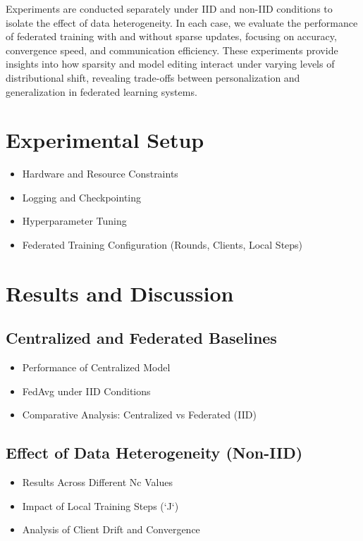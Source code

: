 \documentclass[10pt,twocolumn,letterpaper]{article}
\begin{document}
Experiments are conducted separately under IID and non-IID conditions to isolate the effect of data heterogeneity. In each case, we evaluate the performance of federated training with and without sparse updates, focusing on accuracy, convergence speed, and communication efficiency. These experiments provide insights into how sparsity and model editing interact under varying levels of distributional shift, revealing trade-offs between personalization and generalization in federated learning systems.



\section{Experimental Setup}
\label{sec:experiments}
\begin{itemize}
    \item Hardware and Resource Constraints 
    \item Logging and Checkpointing  
    \item Hyperparameter Tuning  
    \item Federated Training Configuration (Rounds, Clients, Local Steps)  
\end{itemize}

\section{Results and Discussion}
\label{sec:results}

\subsection{Centralized and Federated Baselines}
\begin{itemize}
    \item Performance of Centralized Model
    \item FedAvg under IID Conditions
    \item Comparative Analysis: Centralized vs Federated (IID)
\end{itemize}

\subsection{Effect of Data Heterogeneity (Non-IID)}
\begin{itemize}
    \item Results Across Different Nc Values
    \item Impact of Local Training Steps (`J`)
    \item Analysis of Client Drift and Convergence
\end{itemize}
\end{document}
